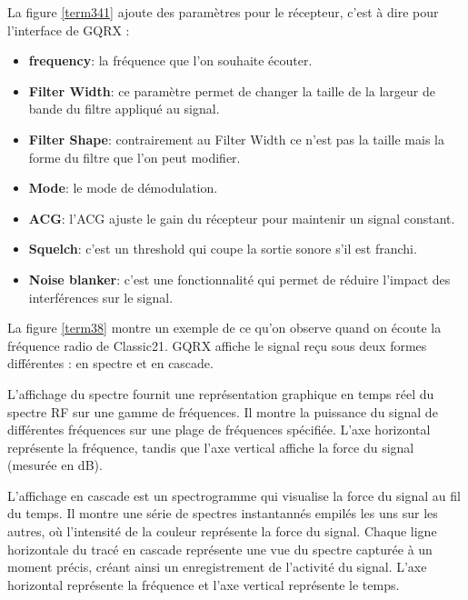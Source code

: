 \vspace{0.1cm}

La figure \ref{term341} ajoute des paramètres pour le récepteur, c'est à dire pour l'interface de GQRX :

\vspace{0.1cm}

\begin{itemize}
\item \textbf{frequency}: la fréquence que l'on souhaite écouter.
\item \textbf{Filter Width}: ce paramètre permet de changer la taille de la largeur de bande du filtre appliqué au signal.
\item \textbf{Filter Shape}: contrairement au Filter Width ce n'est pas la taille mais la forme du filtre que l'on peut modifier.
\item \textbf{Mode}: le mode de démodulation.
\item \textbf{\ac{ACG}}: l'\ac{ACG} ajuste le gain du récepteur pour maintenir un signal constant.
\item \textbf{Squelch}: c'est un threshold qui coupe la sortie sonore s'il est franchi.
\item \textbf{Noise blanker}: c'est une fonctionnalité qui permet de réduire l'impact des interférences sur le signal.
\end{itemize}

\vspace{0.1cm}

La figure \ref{term38} montre un exemple de ce qu'on observe quand on écoute la fréquence radio de Classic21. GQRX affiche le signal reçu sous deux formes différentes : en spectre et en cascade.

\vspace{0.1cm}

L'affichage du spectre fournit une représentation graphique en temps réel du spectre RF sur une gamme de fréquences.
Il montre la puissance du signal de différentes fréquences sur une plage de fréquences spécifiée.
L'axe horizontal représente la fréquence, tandis que l'axe vertical affiche la force du signal (mesurée en dB).

\vspace{0.1cm}

L'affichage en cascade est un spectrogramme qui visualise la force du signal au fil du temps.
Il montre une série de spectres instantannés empilés les uns sur les autres, où l'intensité de la couleur représente la force du signal.
Chaque ligne horizontale du tracé en cascade représente une vue du spectre capturée à un moment précis, créant ainsi un enregistrement de l'activité du signal.
L'axe horizontal représente la fréquence et l'axe vertical représente le temps.

